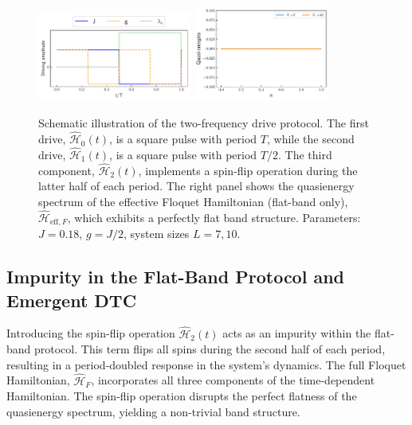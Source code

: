 \documentclass[a4paper,10pt]{article}
\begin{document}
\begin{figure}[h!]
    \centering
    \includegraphics[width=0.45\textwidth]{figs/drive.pdf}
    \includegraphics[width=0.4\textwidth]{figs/pure_flatband.pdf}
    \caption{Schematic illustration of the two-frequency drive protocol. The first drive, $\hat{\mathcal{H}}_0(t)$, is a square pulse with period $T$, while the second drive, $\hat{\mathcal{H}}_1(t)$, is a square pulse with period $T/2$. The third component, $\hat{\mathcal{H}}_2(t)$, implements a spin-flip operation during the latter half of each period. The right panel shows the quasienergy spectrum of the effective Floquet Hamiltonian (flat-band only), $\hat{\mathcal{H}}_{\text{eff},F}$, which exhibits a perfectly flat band structure. Parameters: $J=0.18$, $g=J/2$, system sizes $L=7, 10$.}
    \label{fig:drive}
\end{figure}

\subsection{Impurity in the Flat-Band Protocol and Emergent DTC}
Introducing the spin-flip operation $\hat{\mathcal{H}}_2(t)$ acts as an impurity within the flat-band protocol. This term flips all spins during the second half of each period, resulting in a period-doubled response in the system's dynamics. The full Floquet Hamiltonian, $\hat{\mathcal{H}}_F$, incorporates all three components of the time-dependent Hamiltonian. The spin-flip operation disrupts the perfect flatness of the quasienergy spectrum, yielding a non-trivial band structure.
\end{document}
